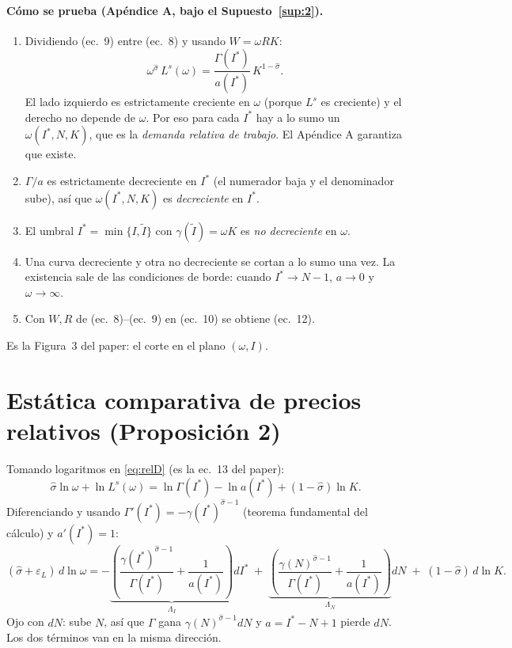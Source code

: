 \documentclass[11pt,a4paper]{article}
\theoremstyle{definition}
\theoremstyle{plain}
\theoremstyle{remark}
\numberwithin{equation}{section}
\newcommand{\sh}{\hat\sigma}
\newcommand{\It}{\tilde I}
\newcommand{\Is}{I^{*}}
\newcommand{\eps}{\varepsilon}
\begin{document}
\paragraph{Cómo se prueba (Apéndice A, bajo el Supuesto~\ref{sup:2}).}
\begin{enumerate}[nosep]
  \item Dividiendo (ec.~9) entre (ec.~8) y usando $W=\omega RK$:
        \begin{equation}\label{eq:relD}
          \omega^{\sh}\,L^s(\omega)=\frac{\Gamma(\Is)}{a(\Is)}\,K^{1-\sh}.
        \end{equation}
        El lado izquierdo es estrictamente creciente en $\omega$ (porque $L^s$ es creciente) y el derecho no depende
        de $\omega$. Por eso para cada $\Is$ hay a lo sumo un $\omega(\Is,N,K)$, que es la \emph{demanda relativa de
        trabajo}. El Apéndice A garantiza que existe.
  \item $\Gamma/a$ es estrictamente decreciente en $\Is$ (el numerador baja y el denominador sube), así que
        $\omega(\Is,N,K)$ es \emph{decreciente} en $\Is$.
  \item El umbral $\Is=\min\{I,\It\}$ con $\gamma(\It)=\omega K$ es \emph{no decreciente} en $\omega$.
  \item Una curva decreciente y otra no decreciente se cortan a lo sumo una vez. La existencia sale de las condiciones
        de borde: cuando $\Is\to N-1$, $a\to0$ y $\omega\to\infty$.
  \item Con $W,R$ de (ec.~8)–(ec.~9) en (ec.~10) se obtiene (ec.~12).
\end{enumerate}
Es la Figura~3 del paper: el corte en el plano $(\omega,I)$.

\section{Estática comparativa de precios relativos (Proposición 2)}

Tomando logaritmos en \eqref{eq:relD} (es la ec.~13 del paper):
\begin{equation}\label{eq:13}
  \sh\ln\omega+\ln L^s(\omega)=\ln\Gamma(\Is)-\ln a(\Is)+(1-\sh)\ln K.
\end{equation}
Diferenciando y usando $\Gamma'(\Is)=-\gamma(\Is)^{\sh-1}$ (teorema fundamental del cálculo) y $a'(\Is)=1$:
\begin{equation}\label{eq:dlnomega}
  (\sh+\eps_L)\,d\ln\omega=-\underbrace{\left(\frac{\gamma(\Is)^{\sh-1}}{\Gamma(\Is)}+\frac{1}{a(\Is)}\right)}_{\Lambda_I}d\Is
  \;+\;\underbrace{\left(\frac{\gamma(N)^{\sh-1}}{\Gamma(\Is)}+\frac{1}{a(\Is)}\right)}_{\Lambda_N}dN
  \;+\;(1-\sh)\,d\ln K .
\end{equation}
Ojo con $dN$: sube $N$, así que $\Gamma$ gana $\gamma(N)^{\sh-1}dN$ y $a=\Is-N+1$ pierde $dN$. Los dos términos van
en la misma dirección.
\end{document}
